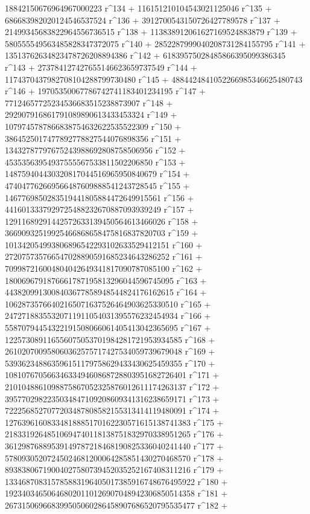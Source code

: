        18842150676964967000223 r^134 + 
       116151210104543021125046 r^135 + 
       686683982020124546537524 r^136 + 
       3912700543150726427789578 r^137 + 
       21499345683822964556736515 r^138 + 
       113838912061627169524883879 r^139 + 
       580555549563485828347372075 r^140 + 
       2852287999040208731284155795 r^141 + 
       13513762634823478726208894386 r^142 + 
       61839575028485866395099386345 r^143 + 
       273784127427655146623659737549 r^144 + 
       1174370437982708104288799730480 r^145 + 
       4884424841052266985346625480743 r^146 + 
       19705350067786742741183401234195 r^147 + 
       77124657725234536683515238873907 r^148 + 
       292907916861791089890613433453324 r^149 + 
       1079745787866838754632622535522309 r^150 + 
       3864525017477892778827544076898356 r^151 + 
       13432787797675243988692808758506956 r^152 + 
       45353563954937555567533811502206850 r^153 + 
       148759404430320817044516965950840679 r^154 + 
       474047762669566487609888541243728545 r^155 + 
       1467769850283519441805884472649915561 r^156 + 
       4416013337929725488232670887093939249 r^157 + 
       12911689291442572633139450564613466026 r^158 + 
       36690932519925466868658475816837820703 r^159 + 
       101342054993806896542293102633529412151 r^160 + 
       272075735766547028890591685234643286252 r^161 + 
       709987216004804042649341817090787085100 r^162 + 
       1800696791876661787195813296044596745095 r^163 + 
       4438209913008403677858948544824176162615 r^164 + 
       10628735766402165071637526464903625330510 r^165 + 
       24727188355320711911054031395576232454934 r^166 + 
       55870794454322191508066061405413042365695 r^167 + 
       122573089116556075053701984281721953934585 r^168 + 
       261020700958060362575717427534059739679048 r^169 + 
       539362348863596151179758629433430625459355 r^170 + 
       1081076705663463349460868728803951682726401 r^171 + 
       2101048861098875867052325876012611174263137 r^172 + 
       3957702982235034847109208609341316238659171 r^173 + 
       7222568527077203487808582155313414119480091 r^174 + 
       12763961608334818885170162230571615138741383 r^175 + 
       21833192648510694740118138751832970338951265 r^176 + 
       36129876889539149787218468190825336040241440 r^177 + 
       57809305207245024681200064285851430270468570 r^178 + 
       89383806719004027580739452035252167408311216 r^179 + 
       133468708315785883196405017385916748676495922 r^180 + 
       192340346506468020110126907048942306850514358 r^181 + 
       267315069668399505060286458907686520795535477 r^182 + 
